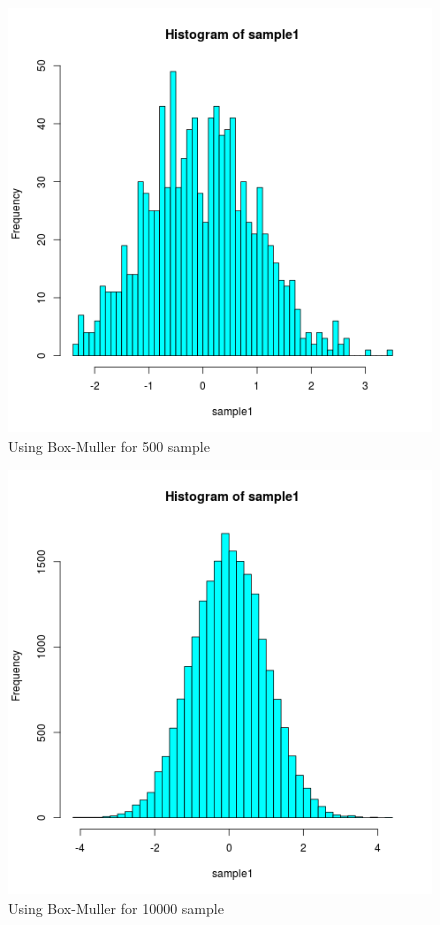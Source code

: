 \documentclass{article}
\begin{document}
			\begin{figure}
  			\includegraphics[width=\linewidth]{pic/que1_five-hund_1.png}
 			 \caption{Using Box-Muller for 500 sample} 
  			\label{fig:hist1}
		\end{figure}
	

			\begin{figure}[!ht]
  			\includegraphics[width=\linewidth]{pic/que1_tenthousand_1.png}
 			 \caption{Using Box-Muller for 10000 sample} 
  			\label{fig:hist1}
		\end{figure}
		
\end{document}
